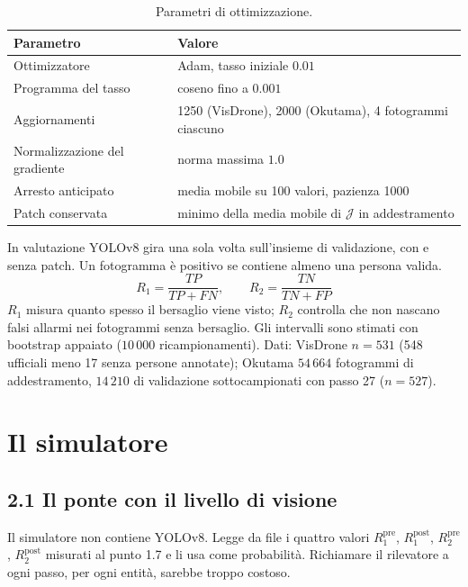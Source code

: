\documentclass[a4paper, 11pt]{article}
\begin{document}
\begin{table}[h]
\centering
\begin{tabular}{ll}
\toprule
\textbf{Parametro} & \textbf{Valore} \\
\midrule
Ottimizzatore & Adam, tasso iniziale $0.01$ \\
Programma del tasso & coseno fino a $0.001$ \\
Aggiornamenti & 1250 (VisDrone), 2000 (Okutama), 4 fotogrammi ciascuno \\
Normalizzazione del gradiente & norma massima $1.0$ \\
Arresto anticipato & media mobile su 100 valori, pazienza 1000 \\
Patch conservata & minimo della media mobile di $\mathcal{J}$ in addestramento \\
\bottomrule
\end{tabular}
\caption{Parametri di ottimizzazione.}
\end{table}

In valutazione YOLOv8 gira una sola volta sull'insieme di validazione, con e
senza patch. Un fotogramma è positivo se contiene almeno una persona valida.
\begin{equation}
R_1 = \frac{TP}{TP + FN}, \qquad R_2 = \frac{TN}{TN + FP}
\end{equation}
$R_1$ misura quanto spesso il bersaglio viene visto; $R_2$ controlla che non
nascano falsi allarmi nei fotogrammi senza bersaglio. Gli intervalli sono
stimati con bootstrap appaiato ($10\,000$ ricampionamenti). Dati:
VisDrone $n = 531$ (548 ufficiali meno 17 senza persone annotate); Okutama
$54\,664$ fotogrammi di addestramento, $14\,210$ di validazione sottocampionati
con passo 27 ($n = 527$).

\section{Il simulatore}

\subsection*{2.1 Il ponte con il livello di visione}

Il simulatore non contiene YOLOv8. Legge da file i quattro valori
$R_1^{\text{pre}}$, $R_1^{\text{post}}$, $R_2^{\text{pre}}$,
$R_2^{\text{post}}$ misurati al punto 1.7 e li usa come probabilità.
Richiamare il rilevatore a ogni passo, per ogni entità, sarebbe troppo
costoso.
\end{document}
